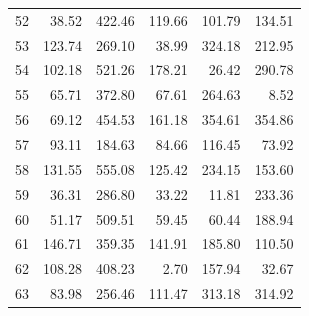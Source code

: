 \begin{longtable}{rrrrrr}
52 & 38.52 & 422.46 & 119.66 & 101.79 & 134.51 \\
53 & 123.74 & 269.10 & 38.99 & 324.18 & 212.95 \\
54 & 102.18 & 521.26 & 178.21 & 26.42 & 290.78 \\
55 & 65.71 & 372.80 & 67.61 & 264.63 & 8.52 \\
56 & 69.12 & 454.53 & 161.18 & 354.61 & 354.86 \\
57 & 93.11 & 184.63 & 84.66 & 116.45 & 73.92 \\
58 & 131.55 & 555.08 & 125.42 & 234.15 & 153.60 \\
59 & 36.31 & 286.80 & 33.22 & 11.81 & 233.36 \\
60 & 51.17 & 509.51 & 59.45 & 60.44 & 188.94 \\
61 & 146.71 & 359.35 & 141.91 & 185.80 & 110.50 \\
62 & 108.28 & 408.23 & 2.70 & 157.94 & 32.67 \\
63 & 83.98 & 256.46 & 111.47 & 313.18 & 314.92 \\
\bottomrule
\end{longtable}
